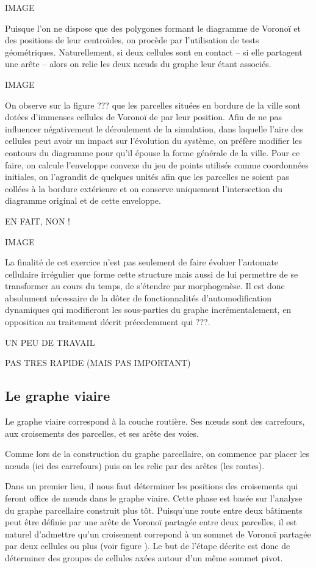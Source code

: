 \documentclass[12pt]{article}
\begin{document}
IMAGE

Puisque l'on ne dispose que des polygones formant le diagramme de
Voronoï et des positions de leur centroïdes, on procède par
l'utilisation de tests géométriques. Naturellement, si deux cellules
sont en contact -- si elle partagent une arête -- alors on relie les
deux n\oe uds du graphe leur étant associés.

IMAGE

On observe sur la figure ??? que les parcelles situées en bordure de
la ville sont dotées d'immenses cellules de Voronoï de par leur
position. Afin de ne pas influencer négativement le déroulement de la
simulation, dans laquelle l'aire des cellules peut avoir un impact sur
l'évolution du système, on préfère modifier les contours du diagramme
pour qu'il épouse la forme générale de la ville. Pour ce faire, on
calcule l'enveloppe convexe du jeu de points utilisés comme
coordonnées initiales, on l'agrandit de quelques unités afin que les
parcelles ne soient pas collées à la bordure extérieure et on conserve
uniquement l'intersection du diagramme original et de cette enveloppe.

EN FAIT, NON !

IMAGE

La finalité de cet exercice n'est pas seulement de faire évoluer
l'automate cellulaire irrégulier que forme cette structure mais aussi
de lui permettre de se transformer au cours du temps, de s'étendre par
morphogenèse. Il est donc absolument nécessaire de la dôter de
fonctionnalités d'automodification dynamiques qui modifieront les
sous-parties du graphe incrémentalement, en opposition au traitement
décrit précedemment qui ???.

UN PEU DE TRAVAIL

PAS TRES RAPIDE (MAIS PAS IMPORTANT)

\subsection{Le graphe viaire}

Le graphe viaire correspond à la couche routière. Ses n\oe uds sont
des carrefours, aux croisements des parcelles, et ses arête des voies.

Comme lors de la construction du graphe parcellaire, on commence par
placer les n\oe uds (ici des carrefours) puis on les relie par des
arêtes (les routes).

Dans un premier lieu, il nous faut déterminer les positions des
croisements qui feront office de n\oe uds dans le graphe viaire. Cette
phase est basée sur l'analyse du graphe parcellaire construit plus
tôt. Puisqu'une route entre deux bâtiments peut être définie par une
arête de Voronoï partagée entre deux parcelles, il est naturel
d'admettre qu'un croisement correpond à un sommet de Voronoï partagée
par deux cellules ou plus (voir figure ). Le but de l'étape décrite
est donc de déterminer des groupes de cellules axées autour d'un même
sommet pivot.
\end{document}
